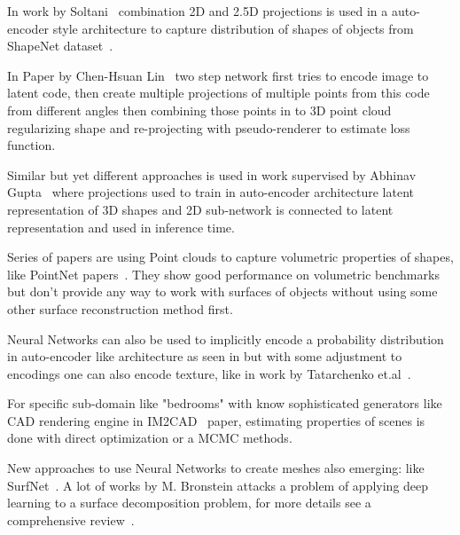 In work by Soltani~\cite{Soltani_2017_CVPR} combination 2D and 2.5D projections is used in a auto-encoder style architecture to capture distribution of shapes of objects from ShapeNet dataset~\cite{chang2015shapenet}.

In Paper by Chen-Hsuan Lin~\cite{lin2017learning} two step network first tries to encode image to latent code, then create multiple projections of multiple points from this code from different angles then combining those points in to 3D point cloud regularizing shape and re-projecting with pseudo-renderer to estimate loss function.

Similar but yet different approaches is used in work supervised by Abhinav Gupta~\cite{girdhar2016learning} where projections used to train in auto-encoder architecture latent representation of 3D shapes and 2D sub-network is connected to latent representation and used in inference time.

Series of papers are using Point clouds to capture volumetric properties of shapes, like PointNet papers~\cite{qi2016pointnet,qi2017pointnet++}. They show good performance on volumetric benchmarks but don't provide any way to work with surfaces of objects without using some other surface reconstruction method first.

Neural Networks can also be used to implicitly encode a probability distribution in auto-encoder like architecture as seen in \cite{dai2016shape,kulkarni2015deep,gwak2017weakly} but with some adjustment to encodings one can also encode texture, like in work by Tatarchenko et.al~\cite{tatarchenko2016multi}.

For specific sub-domain like "bedrooms" with know sophisticated generators like CAD rendering engine in IM2CAD~\cite{izadinia2017im2cad} paper, estimating properties of scenes is done with direct optimization or a MCMC methods. 

New approaches to use Neural Networks to create meshes also emerging: like SurfNet~\cite{Sinha_2017_CVPR}. A lot of works by M. Bronstein attacks a problem of applying deep learning to a surface decomposition problem, for more details see a comprehensive review~\cite{2016arXiv161108097B}.


